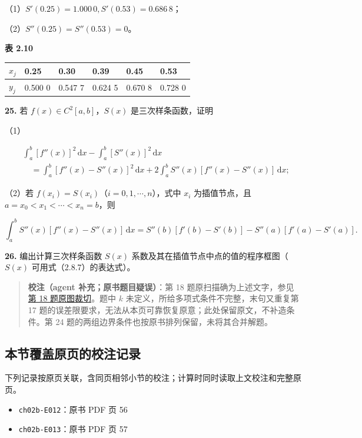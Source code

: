 \documentclass[
  10pt,
  fontset=fandol]{ctexart}
\newcounter{none} %
\providecommand{\tightlist}{%
  \setlength{\itemsep}{0pt}\setlength{\parskip}{0pt}}
\begin{document}
（1）\(S'(0.25)=1.000\,0,S'(0.53)=0.686\,8\)；

（2）\(S''(0.25)=S''(0.53)=0\)。

\textbf{表 2.10}

{\def\LTcaptype{none} %
\begin{longtable}[]{@{}llllll@{}}
\toprule\noalign{}
\(x_j\) & 0.25 & 0.30 & 0.39 & 0.45 & 0.53 \\
\midrule\noalign{}
\endhead
\bottomrule\noalign{}
\endlastfoot
\(y_j\) & 0.500 0 & 0.547 7 & 0.624 5 & 0.670 8 & 0.728 0 \\
\end{longtable}
}

\textbf{25.} 若 \(f(x)\in C^2[a,b]\)，\(S(x)\) 是三次样条函数，证明

（1）

\[\begin{aligned}
&\int_a^b[f''(x)]^2\,\mathrm dx-\int_a^b[S''(x)]^2\,\mathrm dx\\
&\quad=\int_a^b[f''(x)-S''(x)]^2\,\mathrm dx+2\int_a^b S''(x)[f''(x)-S''(x)]\,\mathrm dx;
\end{aligned}\]

（2）若 \(f(x_i)=S(x_i)\)（\(i=0,1,\cdots,n\)），式中 \(x_i\) 为插值节点，且 \(a=x_0<x_1<\cdots<x_n=b\)，则

\[\int_a^b S''(x)[f''(x)-S''(x)]\,\mathrm dx=S''(b)[f'(b)-S'(b)]-S''(a)[f'(a)-S'(a)].\]

\textbf{26.} 编出计算三次样条函数 \(S(x)\) 系数及其在插值节点中点的值的程序框图（\(S(x)\) 可用式（2.8.7）的表达式）。

\begin{quote}
\textbf{校注（agent 补充；原书题目疑误）}：第 18 题原扫描确为上述文字，参见\href{../assets/ch02b/pdf-057-exercise-18-detail.png}{第 18 题原图裁切}。题中 \(k\) 未定义，所给多项式条件不完整，末句又重复第 17 题的误差限要求，无法从本页可靠恢复原意；此处保留原文，不补造条件。第 24 题的两组边界条件也按原书排列保留，未将其合并解题。
\end{quote}

\subsection{本节覆盖原页的校注记录}\label{ux672cux8282ux8986ux76d6ux539fux9875ux7684ux6821ux6ce8ux8bb0ux5f55}

下列记录按原页关联，含同页相邻小节的校注；计算时同时读取上文校注和完整原页。

\begin{itemize}
\tightlist
\item
  \texttt{ch02b-E012}：原书 PDF 页 56
\item
  \texttt{ch02b-E013}：原书 PDF 页 57
\end{itemize}
\end{document}
